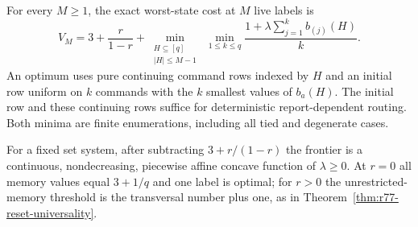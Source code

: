 \begin{theorem}
\label{thm:r78-cover-frontier}
For every $M\ge1$, the exact worst-state cost at $M$ live labels is
\begin{equation}\label{eq:r78-cover-spectrum}
 V_M=3+\frac r{1-r}+
 \min_{\substack{H\subseteq[q]\\ |H|\le M-1}}
 \ \min_{1\le k\le q}
       \frac{1+\lambda\sum_{j=1}^k b_{(j)}(H)}{k}.
\end{equation}
An optimum uses pure continuing command rows indexed by $H$ and an
initial row uniform on $k$ commands with the $k$ smallest values of
$b_a(H)$.  The initial row and these continuing rows suffice for
deterministic report-dependent routing.  Both minima are finite
enumerations, including all tied and degenerate cases.

For a fixed set system, after subtracting $3+r/(1-r)$ the frontier
is a continuous, nondecreasing, piecewise affine concave function
of $\lambda\ge0$.  At $r=0$ all memory values equal $3+1/q$ and
one label is optimal; for $r>0$ the unrestricted-memory threshold
is the transversal number plus one, as in
Theorem~\ref{thm:r77-reset-universality}.
\end{theorem}
